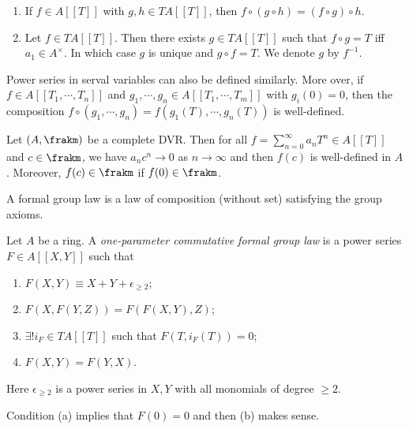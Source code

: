   \begin{lemma}
    \begin{enumerate}
      \item If $f \in A[[T]]$ with $g,h \in T A[[T]]$, then $f \circ (g \circ h) = (f \circ g) \circ h$.
      \item Let $f \in T A[[T]]$. Then there exists $g \in T A[[T]]$ such that $f \circ g = T$ iff $a_1 \in A^\times$.
        In which case $g$ is unique and $g \circ f = T$. 
        We denote $g$ by $f^{-1}$.
    \end{enumerate}
  \end{lemma}

  Power series in serval variables can also be defined similarly.
  More over, if $f \in A[[T_1,\cdots,T_n]]$ and $g_1,\cdots,g_n \in A[[T_1,\cdots,T_m]]$ with $g_i(0) = 0$, then the composition $f \circ (g_1,\cdots,g_n) = f(g_1(T),\cdots,g_n(T))$ is well-defined.

  \begin{remark}
    Let $(A,\frakm)$ be a complete DVR.
    Then for all $f = \sum_{n=0}^\infty a_n T^n \in A[[T]]$ and $c \in \frakm$, we have $a_n c^n \to 0$ as $n \to \infty$ and then $f(c)$ is well-defined in $A$.
    Moreover, $f(c) \in \frakm$ if $f(0) \in \frakm$.
  \end{remark}

  \begin{slogan}
    A formal group law is a law of composition (without set) satisfying the group axioms.
  \end{slogan}

  \begin{definition}
    Let $A$ be a ring.
    A \emph{one-parameter commutative formal group law} is a power series $F \in A[[X,Y]]$ such that
    \begin{enumerate}
      \item $F(X,Y) \equiv X+Y + \epsilon_{\geq 2}$;
      \item $F(X,F(Y,Z)) = F(F(X,Y),Z)$;
      \item $\exists ! i_{F} \in T A[[T]]$ such that $F(T,i_F(T)) = 0$;
      \item $F(X,Y) = F(Y,X)$.
    \end{enumerate}
    Here $\epsilon_{\geq 2}$ is a power series in $X,Y$ with all monomials of degree $\geq 2$.
  \end{definition}

  \begin{remark}
    Condition (a) implies that $F(0) = 0$ and then (b) makes sense.
  \end{remark}

